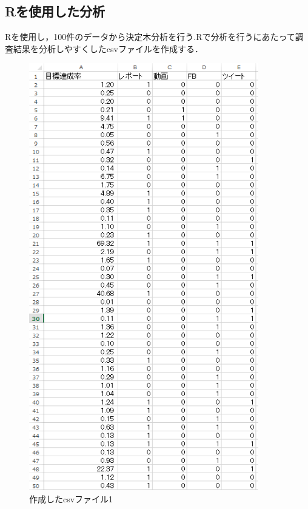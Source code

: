 \subsection{Rを使用した分析}
Rを使用し，100件のデータから決定木分析を行う.Rで分析を行うにあたって調査結果を分析しやすくしたcsvファイルを作成する．
\begin{figure}[H]
\centering
\includegraphics[width=10cm]{keka1.PNG}
\caption{作成したcsvファイル1}\label{サンプル図}
\end{figure}

